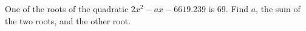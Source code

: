 One of the roots of the quadratic $2x^2-ax-6619.239$ is $69$. Find $a$, the sum of the two roots, and the other root.
